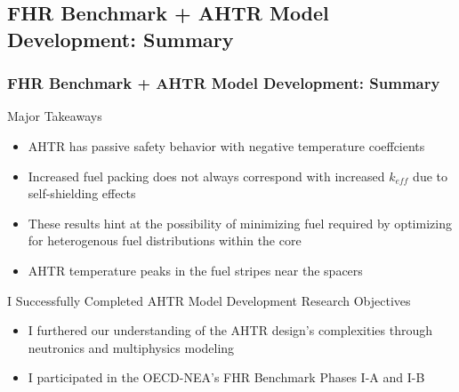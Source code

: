 \subsection{FHR Benchmark + AHTR Model Development: Summary}
\begin{frame}
    \frametitle{FHR Benchmark + AHTR Model Development: Summary}
    \begin{block}{Major Takeaways}
        \begin{itemize}
            \item AHTR has passive safety behavior with negative temperature coeffcients
            \item Increased fuel packing does not always correspond with increased 
            $k_{eff}$ due to self-shielding effects 
            \item These results hint at the possibility of minimizing fuel required by 
            optimizing for heterogenous fuel distributions within the core
            \item AHTR temperature peaks in the fuel stripes near the spacers 
        \end{itemize}
    \end{block}
    \begin{block}{I Successfully Completed AHTR Model Development Research Objectives}
        \begin{itemize}
            \item I furthered our understanding of the AHTR design's complexities 
            through neutronics and multiphysics modeling
            \item I participated in the OECD-NEA's FHR Benchmark Phases I-A and I-B
        \end{itemize}
    \end{block}
\end{frame}
